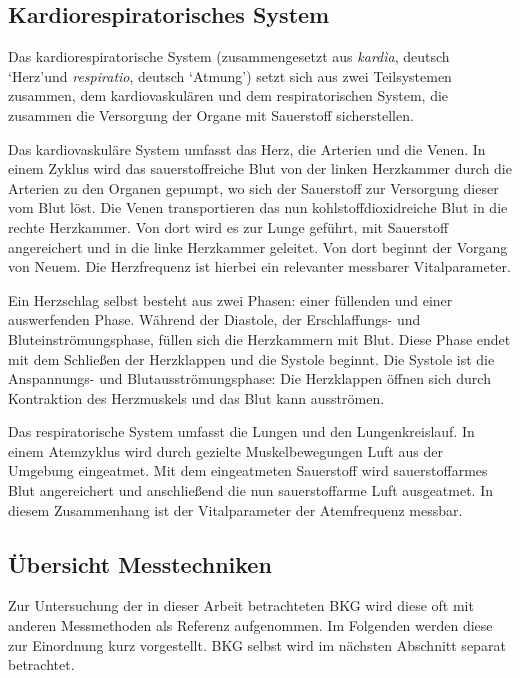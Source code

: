	\subsection{Kardiorespiratorisches System}
	
	Das kardiorespiratorische System (zusammengesetzt aus \textit{kardìa}, deutsch \textquoteleft Herz\textquoteright und \textit{respiratio}, deutsch \textquoteleft Atmung\textquoteright) setzt sich aus zwei Teilsystemen zusammen, dem kardiovaskulären und dem respiratorischen System, die zusammen die Versorgung der Organe mit Sauerstoff sicherstellen.
	
	Das kardiovaskuläre System umfasst das Herz, die Arterien und die Venen. In einem Zyklus wird das sauerstoffreiche Blut von der linken Herzkammer durch die Arterien zu den Organen gepumpt, wo sich der Sauerstoff zur Versorgung dieser vom Blut löst. Die Venen transportieren das nun kohlstoffdioxidreiche Blut in die rechte Herzkammer. Von dort wird es zur Lunge geführt, mit Sauerstoff angereichert und in die linke Herzkammer geleitet. Von dort beginnt der Vorgang von Neuem. Die Herzfrequenz ist hierbei ein relevanter messbarer Vitalparameter.
	
	Ein Herzschlag selbst besteht aus zwei Phasen: einer füllenden und einer auswerfenden Phase. Während der Diastole, der Erschlaffungs- und Bluteinströmungsphase, füllen sich die Herzkammern mit Blut. Diese Phase endet mit dem Schließen der Herzklappen und die Systole beginnt. Die Systole ist die Anspannungs- und Blutausströmungsphase: Die Herzklappen öffnen sich durch Kontraktion des Herzmuskels und das Blut kann ausströmen.
	
	Das respiratorische System umfasst die Lungen und den Lungenkreislauf. In einem Atemzyklus wird durch gezielte Muskelbewegungen Luft aus der Umgebung eingeatmet. Mit dem eingeatmeten Sauerstoff wird sauerstoffarmes Blut angereichert und anschließend die nun sauerstoffarme Luft ausgeatmet. In diesem Zusammenhang ist der Vitalparameter der Atemfrequenz messbar.

	\subsection{Übersicht Messtechniken}
	
	Zur Untersuchung der in dieser Arbeit betrachteten \acf{BKG} wird diese oft mit anderen Messmethoden als Referenz aufgenommen. Im Folgenden werden diese zur Einordnung kurz vorgestellt. \ac{BKG} selbst wird im nächsten Abschnitt separat betrachtet.
	
